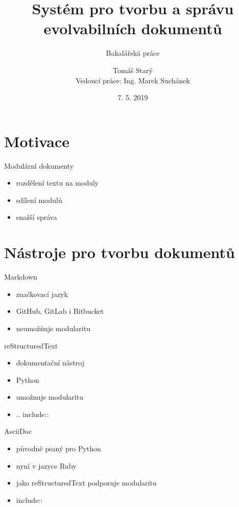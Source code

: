 \documentclass[czech,aspectratio=169]{beamer}
\title[Systém pro tvorbu a správu evolvabilních dokumentů]{Systém pro tvorbu a správu evolvabilních dokumentů}
\subtitle{Bakalářská práce}
\institute[FIT ČVUT v Praze]{Fakulta informačních technologií \\ České vysoké učení technické v Praze}
\author[T. Starý]{Tomáš Starý \\ Vedoucí práce: Ing. Marek Suchánek}
\date{7. 5. 2019}
\begin{document}
\begin{frame}
    \titlepage{} %
\end{frame}

\begin{frame}
    \tableofcontents
\end{frame}

\section{Motivace}
    \begin{frame}
        \tableofcontents[currentsection]
    \end{frame}
    \begin{frame}{Modulární dokumenty}
        \begin{itemize}
            \item rozdělení textu na moduly \pause{}
            \item sdílení modulů \pause{}
            \item snažší správa
        \end{itemize}
    \end{frame}

\section{Nástroje pro tvorbu dokumentů}
    \begin{frame}
        \tableofcontents[currentsection]
    \end{frame}
    \begin{frame}{Markdown}
        \begin{itemize}
            \item značkovací jazyk \pause{}
            \item GitHub, GitLab i Bitbucket \pause{}
            \item neumožňuje modularitu
        \end{itemize}
    \end{frame}
    \begin{frame}{reStructuredText}
        \begin{itemize}
            \item dokumentační nástroj \pause{}
            \item Python \pause{}
            \item umožnuje modularitu \pause{}
            \item .. include::
        \end{itemize}
    \end{frame}
    \begin{frame}{AsciiDoc}
        \begin{itemize}
            \item původně psaný pro Python \pause{}
            \item nyní v jazyce Ruby \pause{}
            \item jako reStructuredText podporuje modularitu \pause{}
            \item include::
        \end{itemize}
    \end{frame}
\end{document}
